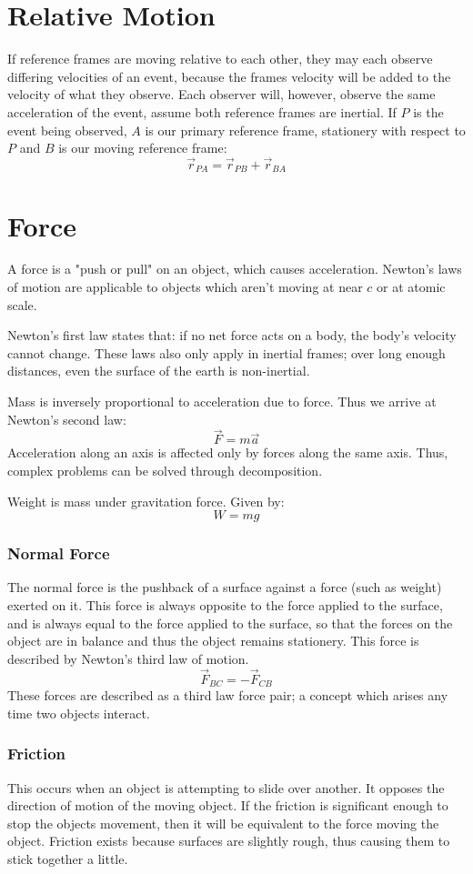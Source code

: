 \documentclass[12pt]{report}
\begin{document}
\begin{flushleft}
\section*{Relative Motion}
If reference frames are moving relative to each other, they may each observe differing velocities of 
an event, because the frames velocity will be added to the velocity of what they observe. Each 
observer will, however, observe the same acceleration of the event, assume both reference frames
are inertial. If \(P\) is the event being observed, \(A\) is our primary reference frame, stationery
with respect to \(P\) and \(B\) is our moving reference frame:
\[\vec{r}_{PA} = \vec{r}_{PB} + \vec{r}_{BA}\]

\section*{Force}
A force is a "push or pull" on an object, which causes acceleration. Newton's laws of 
motion are applicable to objects which aren't moving at near \(c\) or at atomic scale.

\bigskip
Newton's first law states that: if no net force acts on a body, the body's velocity cannot change.
These laws also only apply in inertial frames; over long enough distances, even the surface of the 
earth is non-inertial.

\bigskip
Mass is inversely proportional to acceleration due to force. Thus we arrive at Newton's second law:
\[\vec{F} = m\vec{a}\]
Acceleration along an axis is affected only by forces along the same axis. Thus, complex
problems can be solved through decomposition.

\bigskip
Weight is mass under gravitation force. Given by:
\[W = mg\]

\subsubsection*{Normal Force}
The normal force is the pushback of a surface against a force (such as weight) exerted on it.
This force is always opposite to the force applied to the surface, and is always equal to the force
applied to the surface, so that the forces on the object are in balance and thus the object remains 
stationery. This force is described by Newton's third law of motion.
\[\vec{F}_{BC} = -\vec{F}_{CB}\]
These forces are described as a third law force pair; a concept which arises any time 
two objects interact.

\subsubsection*{Friction}
This occurs when an object is attempting to slide over another. It opposes the direction
of motion of the moving object. If the friction is significant enough to stop the objects 
movement, then it will be equivalent to the force moving the object. Friction exists because
surfaces are slightly rough, thus causing them to stick together a little.


\end{flushleft}
\end{document}
